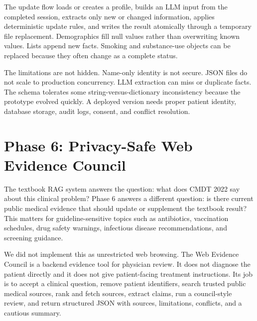 The update flow loads or creates a profile, builds an LLM input from the completed session, extracts only new or changed information, applies deterministic update rules, and writes the result atomically through a temporary file replacement. Demographics fill null values rather than overwriting known values. Lists append new facts. Smoking and substance-use objects can be replaced because they often change as a complete status.

The limitations are not hidden. Name-only identity is not secure. JSON files do not scale to production concurrency. LLM extraction can miss or duplicate facts. The schema tolerates some string-versus-dictionary inconsistency because the prototype evolved quickly. A deployed version needs proper patient identity, database storage, audit logs, consent, and conflict resolution.

\section{Phase 6: Privacy-Safe Web Evidence Council}

The textbook RAG system answers the question: what does CMDT 2022 say about this clinical problem? Phase 6 answers a different question: is there current public medical evidence that should update or supplement the textbook result? This matters for guideline-sensitive topics such as antibiotics, vaccination schedules, drug safety warnings, infectious disease recommendations, and screening guidance.

We did not implement this as unrestricted web browsing. The Web Evidence Council is a backend evidence tool for physician review. It does not diagnose the patient directly and it does not give patient-facing treatment instructions. Its job is to accept a clinical question, remove patient identifiers, search trusted public medical sources, rank and fetch sources, extract claims, run a council-style review, and return structured JSON with sources, limitations, conflicts, and a cautious summary.

